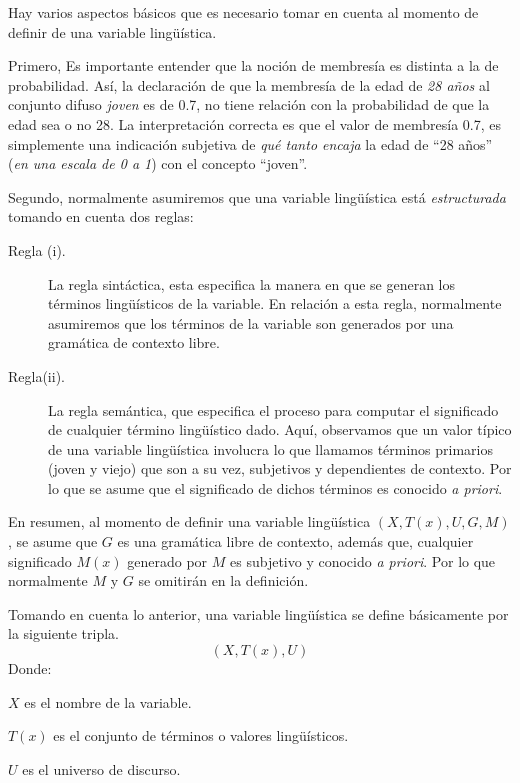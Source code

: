 Hay varios aspectos básicos que es necesario tomar en cuenta al momento de definir de una variable lingüística.

Primero, Es importante entender que la noción de membresía es distinta a la de probabilidad. Así, la declaración de que la membresía de la edad de \emph{28 años} al conjunto difuso \emph{joven} es de 0.7, no tiene relación con la probabilidad de que la edad sea o no 28.
La interpretación correcta es que el valor de membresía 0.7, es simplemente una indicación subjetiva de \emph{qué tanto encaja} la edad de ``28 años'' (\textit{en una escala de 0 a 1}) con el concepto ``joven''.

Segundo, normalmente asumiremos que una variable lingüística está \emph{estructurada} tomando en cuenta dos reglas:
\begin{description}
	\item[Regla (i).] La regla sintáctica, esta especifica la manera en que se generan los términos lingüísticos de la variable.
	En relación a esta regla, normalmente asumiremos que los términos de la variable son generados por una gramática de contexto libre.
	\item[Regla(ii).] La regla semántica, que especifica el proceso para computar el significado de cualquier término lingüístico dado. Aquí, observamos que un valor típico de una variable lingüística involucra lo que llamamos términos primarios (joven y viejo) que son a su vez, subjetivos y dependientes de contexto. Por lo que se asume que el significado de dichos términos es conocido \emph{a priori}.
\end{description}

En resumen, al momento de definir una variable lingüística $(X,T(x),U,G,M)$, se asume que $G$ es una gramática libre de contexto, además que,
cualquier significado $M(x)$  generado por $M$ es subjetivo y conocido \emph{a priori}. Por lo que normalmente $M$ y $G$ se omitirán en la definición.

Tomando en cuenta lo anterior, una variable lingüística se define básicamente por la siguiente tripla.
$$(X,T(x),U)$$
Donde:
{\setlength{\baselineskip}{0.7\baselineskip}\begin{description}
	\item $X$ es el nombre de la variable.
	\item $T(x)$ es el conjunto de términos o valores lingüísticos.
	\item $U$ es el universo de discurso.
\end{description}}


